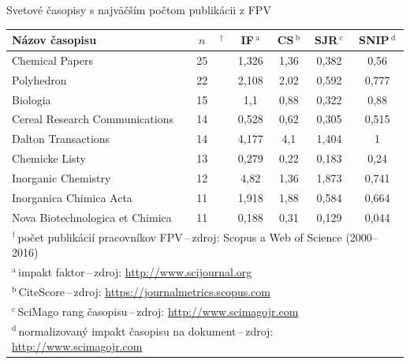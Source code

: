 \documentclass{beamer}
\begin{document}
%
%
\begin{frame}{Svetové časopisy s najväčším počtom publikácii z FPV}
  \begin{table}
    \footnotesize
    \begin{tabular}{lc@{}lcccc}
      \toprule
      Názov časopisu & $n$&$^{\dagger}$ & IF\,$^{\mathrm{a}}$  & CS\,$^{\mathrm{b}}$ & SJR\,$^{\mathrm{c}}$ & SNIP\,$^{\mathrm{d}}$ \\
      \midrule
      Chemical Papers                 & 25& & 1,326            & 1,36          & 0,382 & 0,56\phantom{0} \\
      Polyhedron                      & 22& & 2,108            & 2,02          & 0,592 & 0,777           \\
      Biologia                        & 15& & 1,1\phantom{00}  & 0,88          & 0,322 & 0,88\phantom{0} \\
      Cereal Research Communications  & 14& & 0,528            & 0,62          & 0,305 & 0,515           \\
      Dalton Transactions             & 14& & 4,177            & 4,1\phantom{0}& 1,404 & 1\phantom{,000} \\[1ex]
      Chemicke Listy                  & 13& & 0,279            & 0,22          & 0,183 & 0,24\phantom{0} \\
      Inorganic Chemistry             & 12& & 4,82\phantom{0}  & 1,36          & 1,873 & 0,741           \\
      Inorganica Chimica Acta         & 11& & 1,918            & 1,88          & 0,584 & 0,664           \\
      Nova Biotechnologica et Chimica & 11& & 0,188            & 0,31          & 0,129 & 0,044           \\
      \bottomrule
      \multicolumn{7}{l}{\tiny $^\dagger$\,počet publikácií pracovníkov FPV\,--\,zdroj: Scopus a Web of Science (2000--2016)} \\
      \multicolumn{7}{l}{\tiny $^{\mathrm{a}}$\,impakt faktor\,--\,zdroj: \url{http://www.scijournal.org}} \\
      \multicolumn{7}{l}{\tiny $^{\mathrm{b}}$\,CiteScore\,--\,zdroj: \url{https://journalmetrics.scopus.com}} \\
      \multicolumn{7}{l}{\tiny $^{\mathrm{c}}$\,SciMago rang časopisu\,--\,zdroj: \url{http://www.scimagojr.com}} \\
      \multicolumn{7}{l}{\tiny $^{\mathrm{d}}$\,normalizovaný impakt časopisu na dokument\,--\,zdroj: \url{http://www.scimagojr.com}} \\
    \end{tabular}
  \end{table}
\end{frame}
\end{document}
